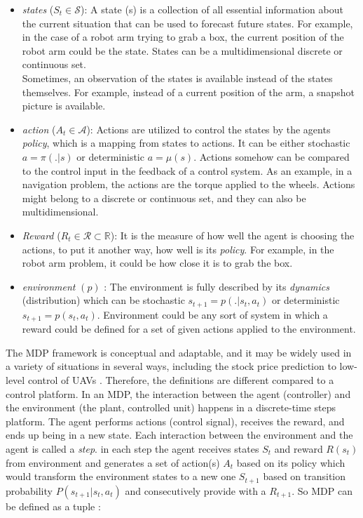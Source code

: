 \begin{itemize}
	
	
	\item \textit{states} ($S_t \in \mathcal{S}$): A state (s) is a collection of all essential information about the current situation that can be used to forecast future states.  For example, in the case of a robot arm trying to grab a box, the current position of the robot arm could be the state. States can be a multidimensional discrete or continuous set. \\
	Sometimes, an observation of the states is available instead of the states themselves. For example, instead of a current position of the arm, a snapshot picture is available. 
	\item \textit{action} ($A_t \in \mathcal{A}$):   Actions are utilized to control the states by the agents \textit{policy}, which is a mapping from states to actions. It can be either stochastic $ a = \pi(.|s)$ or deterministic $a=\mu(s)$.  Actions somehow can be compared to the control input in the feedback of a control system. As an example, in a navigation problem, the actions are the torque applied to the wheels. Actions might belong to a discrete or continuous set, and they can also be multidimensional.
	\item \textit{Reward} ($R_t \in \mathcal{R} \subset \mathbb{R}$):  It is the measure of how well the agent is choosing the actions, to put it another way, how well is its \textit{policy}. For example, in the robot arm problem, it could be how close it is to grab the box.
	\item \textit{environment} $(p)$ : The environment is fully described by its \textit{dynamics} (distribution) which can be stochastic $s_{t+1} = p(.|s_t,a_t)$ or deterministic $s_{t+1} = p(s_t,a_t)$. Environment could be any sort of system in which a reward could be defined for a set of given actions applied to the environment. 	
	
\end{itemize}
The MDP framework is conceptual and adaptable, and it may be widely used in a variety of situations in several ways, including the stock price prediction \cite{lee2001stock} to low-level control of UAVs \cite{pi2020low}. Therefore, the definitions are different compared to a control platform. In an MDP, the interaction between the agent (controller) and the environment (the plant, controlled unit) happens in a discrete-time steps platform. The agent performs actions (control signal), receives the reward, and ends up being in a new state. Each interaction between the environment and the agent is called a \textit{step}. in each step the agent receives states $S_t$ and reward $R(s_t)$ from environment and generates a set of action(s) $A_t$  based on its policy which would transform the environment states to a new one $S_{t+1}$ based on transition probability $P(s_{t+1}|s_t,a_t)$ and consecutively provide with a $R_{t+1}$. So MDP can be defined as a tuple \cite{sutton2018reinforcement}:

